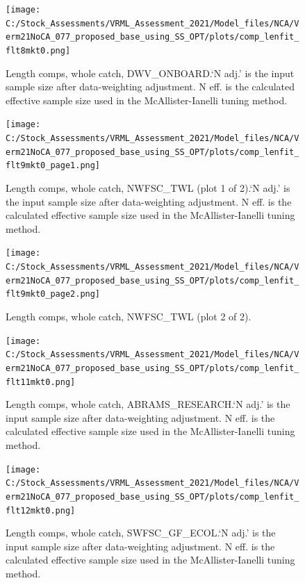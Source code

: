 \documentclass[
  english,
  a4paper,
]{article}
\begin{document}
\begin{figure}
\centering
\texttt{[image: C:/Stock\_Assessments/VRML\_Assessment\_2021/Model\_files/NCA/Verm21NoCA\_077\_proposed\_base\_using\_SS\_OPT/plots/comp\_lenfit\_flt8mkt0.png]}
\caption{Length comps, whole catch, DWV\_ONBOARD.`N adj.' is the input sample size after data-weighting adjustment. N eff. is the calculated effective sample size used in the McAllister-Ianelli tuning method.\label{fig:comp_lenfit_flt8mkt0}}
\end{figure}

\begin{figure}
\centering
\texttt{[image: C:/Stock\_Assessments/VRML\_Assessment\_2021/Model\_files/NCA/Verm21NoCA\_077\_proposed\_base\_using\_SS\_OPT/plots/comp\_lenfit\_flt9mkt0\_page1.png]}
\caption{Length comps, whole catch, NWFSC\_TWL (plot 1 of 2).`N adj.' is the input sample size after data-weighting adjustment. N eff. is the calculated effective sample size used in the McAllister-Ianelli tuning method.\label{fig:comp_lenfit_flt9mkt0_page1}}
\end{figure}

\begin{figure}
\centering
\texttt{[image: C:/Stock\_Assessments/VRML\_Assessment\_2021/Model\_files/NCA/Verm21NoCA\_077\_proposed\_base\_using\_SS\_OPT/plots/comp\_lenfit\_flt9mkt0\_page2.png]}
\caption{Length comps, whole catch, NWFSC\_TWL (plot 2 of 2).\label{fig:comp_lenfit_flt9mkt0_page2}}
\end{figure}

\begin{figure}
\centering
\texttt{[image: C:/Stock\_Assessments/VRML\_Assessment\_2021/Model\_files/NCA/Verm21NoCA\_077\_proposed\_base\_using\_SS\_OPT/plots/comp\_lenfit\_flt11mkt0.png]}
\caption{Length comps, whole catch, ABRAMS\_RESEARCH.`N adj.' is the input sample size after data-weighting adjustment. N eff. is the calculated effective sample size used in the McAllister-Ianelli tuning method.\label{fig:comp_lenfit_flt11mkt0}}
\end{figure}

\begin{figure}
\centering
\texttt{[image: C:/Stock\_Assessments/VRML\_Assessment\_2021/Model\_files/NCA/Verm21NoCA\_077\_proposed\_base\_using\_SS\_OPT/plots/comp\_lenfit\_flt12mkt0.png]}
\caption{Length comps, whole catch, SWFSC\_GF\_ECOL.`N adj.' is the input sample size after data-weighting adjustment. N eff. is the calculated effective sample size used in the McAllister-Ianelli tuning method.\label{fig:comp_lenfit_flt12mkt0}}
\end{figure}
\end{document}
